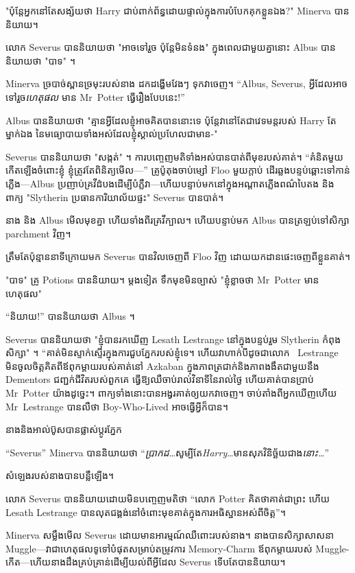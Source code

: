 "ប៉ុន្តែអ្នកនៅតែសង្ស័យថា Harry ជាប់ពាក់ព័ន្ធដោយផ្ទាល់ក្នុងការបំបែកគុកខ្លួនឯង?" Minerva បាននិយាយ។

លោក Severus បាននិយាយថា "អាចទៅរួច ប៉ុន្តែមិនទំនង" ក្នុងពេលជាមួយគ្នានោះ Albus បាននិយាយថា "បាទ" ។

Minerva ច្របាច់ស្ពានច្រមុះរបស់នាង ដកដង្ហើមវែងៗ ទុកវាចេញ។ “Albus, Severus, អ្វីដែលអាចទៅរួច\emph{ហេតុផល} មាន Mr~Potter ធ្វើរឿងបែបនេះ!”

Albus បាននិយាយថា "គ្មានអ្វីដែលខ្ញុំអាចគិតបាននោះទេ ប៉ុន្តែវានៅតែជាវេទមន្តរបស់ Harry តែម្នាក់ឯង នៃមធ្យោបាយទាំងអស់ដែលខ្ញុំស្គាល់ប្រហែលជាមាន-"

Severus បាននិយាយថា "សង្កត់" ។ ការបញ្ចេញមតិទាំងអស់បានបាត់ពីមុខរបស់គាត់។ “គំនិតមួយកើតឡើងចំពោះខ្ញុំ ខ្ញុំត្រូវតែពិនិត្យមើល—” គ្រូប៉ូតុងចាប់ម្សៅ Floo មួយក្តាប់ ដើរឆ្លងបន្ទប់ឆ្ពោះទៅកាន់ភ្លើង—Albus ប្រញាប់គ្រវីដំបងដើម្បីបំភ្លឺវា—ហើយបន្ទាប់មកនៅក្នុងអណ្តាតភ្លើងពណ៌បៃតង និង ពាក្យ "Slytherin ប្រធានការិយាល័យផ្ទះ" Severus បានបាត់។

នាង និង Albus មើលមុខគ្នា ហើយទាំងពីរគ្រវីក្បាល។ ហើយបន្ទាប់មក Albus បានត្រឡប់ទៅសិក្សា parchment វិញ។

ត្រឹមតែប៉ុន្មាននាទីក្រោយមក Severus បានវិលចេញពី Floo វិញ ដោយយកដានផេះចេញពីខ្លួនគាត់។

"បាទ" គ្រូ Potions បាននិយាយ។ ម្តងទៀត ទឹកមុខមិនច្បាស់ "ខ្ញុំខ្លាចថា Mr~Potter មានហេតុផល"

“និយាយ!” បាននិយាយថា Albus ។

Severus បាននិយាយថា "ខ្ញុំបានរកឃើញ Lesath Lestrange នៅក្នុងបន្ទប់រួម Slytherin កំពុងសិក្សា" ។ “គាត់មិនស្ទាក់ស្ទើរក្នុងការជួបភ្នែករបស់ខ្ញុំទេ។ ហើយវាហាក់បីដូចជាលោក ~Lestrange មិនចូលចិត្តគិតពីឪពុកម្តាយរបស់គាត់នៅ Azkaban ក្នុងភាពត្រជាក់និងភាពងងឹតជាមួយនឹង Dementors ជញ្ជក់ជីវិតរបស់ពួកគេ ធ្វើឱ្យឈឺចាប់រាល់វិនាទីនៃរាល់ថ្ងៃ ហើយគាត់បានប្រាប់ Mr~Potter យ៉ាងដូច្នេះ។ ពាក្យ​ទាំង​នោះ​បាន​អង្វរ​គាត់​ឲ្យ​យក​វា​ចេញ។ ចាប់តាំងពីអ្នកឃើញហើយ Mr~Lestrange បានលឺថា Boy-Who-Lived អាចធ្វើអ្វីក៏បាន។

នាងនិងអាល់ប៊ូសបានផ្លាស់ប្តូរភ្នែក

“Severus” Minerva បាននិយាយថា “\emph{ប្រាកដ}…សូម្បីតែ\emph{Harry}…មានសុភវិនិច្ឆ័យជាង\emph{នោះ…}”

សំឡេងរបស់នាងបានបន្លឺឡើង។

លោក Severus បាន​និយាយ​ដោយ​មិន​បញ្ចេញ​មតិ​ថា “លោក Potter គិត​ថា​គាត់​ជា​ព្រះ ហើយ Lesath Lestrange បាន​លុត​ជង្គង់​នៅ​ចំពោះ​មុខ​គាត់​ក្នុង​ការ​អធិស្ឋាន​អស់​ពី​ចិត្ត”។

Minerva សម្លឹងមើល Severus ដោយមានអារម្មណ៍ឈឺពោះរបស់នាង។ នាងបានសិក្សាសាសនា Muggle—វាជាហេតុផលទូទៅបំផុតសម្រាប់តម្រូវការ Memory-Charm ឪពុកម្តាយរបស់ Muggle-កើត—ហើយនាងដឹងគ្រប់គ្រាន់ដើម្បីយល់ពីអ្វីដែល Severus ទើបតែបាននិយាយ។

